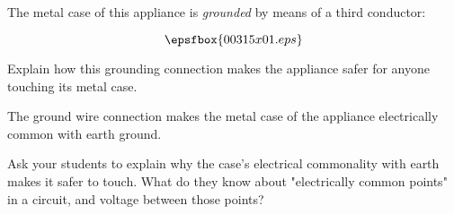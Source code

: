 

The metal case of this appliance is {\it grounded} by means of a third conductor:

$$\epsfbox{00315x01.eps}$$

Explain how this grounding connection makes the appliance safer for anyone touching its metal case.







The ground wire connection makes the metal case of the appliance electrically common with earth ground.







Ask your students to explain why the case's electrical commonality with earth makes it safer to touch.  What do they know about "electrically common points" in a circuit, and voltage between those points?




